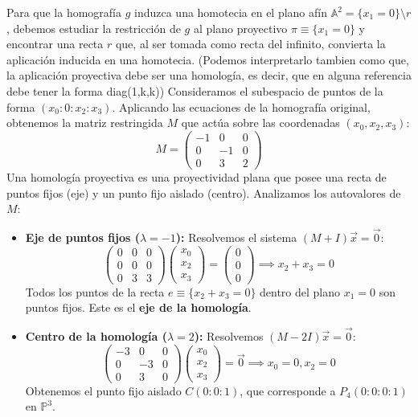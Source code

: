 {Para que la homografía $g$ induzca una homotecia en el plano afín $\mathbb{A}^2 = \{x_1 = 0\} \setminus r$, debemos estudiar la restricción de $g$ al plano proyectivo $\pi \equiv \{x_1 = 0\}$ y encontrar una recta $r$ que, al ser tomada como recta del infinito, convierta la aplicación inducida en una homotecia. (Podemos interpretarlo tambien como que, la aplicación proyectiva debe ser una homología, es decir, que en alguna referencia debe tener la forma diag(1,k,k))
Consideramos el subespacio de puntos de la forma $(x_0 : 0 : x_2 : x_3)$. Aplicando las ecuaciones de la homografía original, obtenemos la matriz restringida $M$ que actúa sobre las coordenadas $(x_0, x_2, x_3)$:
\[
M = \begin{pmatrix} 
-1 & 0 & 0 \\ 
0 & -1 & 0 \\ 
0 & 3 & 2 
\end{pmatrix}\]
Una homología proyectiva es una proyectividad plana que posee una recta de puntos fijos (eje) y un punto fijo aislado (centro). Analizamos los autovalores de $M$:
\begin{itemize}
    \item \textbf{Eje de puntos fijos ($\lambda = -1$):} Resolvemos el sistema $(M + I)\vec{x} = \vec{0}$:
    \[
    \begin{pmatrix} 0 & 0 & 0 \\ 0 & 0 & 0 \\ 0 & 3 & 3 \end{pmatrix} \begin{pmatrix} x_0 \\ x_2 \\ x_3 \end{pmatrix} = \begin{pmatrix} 0 \\ 0 \\ 0 \end{pmatrix} \implies x_2 + x_3 = 0
    \]
    Todos los puntos de la recta $e \equiv \{x_2 + x_3 = 0\}$ dentro del plano $x_1=0$ son puntos fijos. Este es el \textbf{eje de la homología}.
    
    \item \textbf{Centro de la homología ($\lambda = 2$):} Resolvemos $(M - 2I)\vec{x} = \vec{0}$:
    \[
    \begin{pmatrix} -3 & 0 & 0 \\ 0 & -3 & 0 \\ 0 & 3 & 0 \end{pmatrix} \begin{pmatrix} x_0 \\ x_2 \\ x_3 \end{pmatrix} = \vec{0} \implies x_0 = 0, x_2 = 0
    \]
    Obtenemos el punto fijo aislado $C(0:0:1)$, que corresponde a $P_4(0:0:0:1)$ en $\mathbb{P}^3$.
\end{itemize}


}

